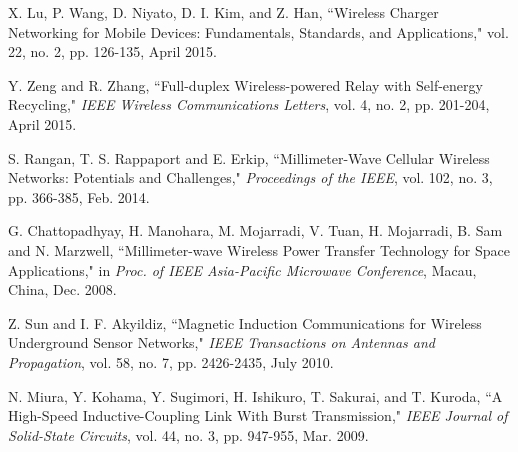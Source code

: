 \documentclass[twocolumn,10pt]{IEEEtran}
\begin{document}
\begin{thebibliography}{99}
X. Lu, P. Wang, D. Niyato, D. I. Kim, and Z. Han, ``Wireless Charger Networking for Mobile Devices: Fundamentals, Standards, and Applications," vol. 22, no. 2, pp. 126-135, April 2015.  
 
 
Y. Zeng and R. Zhang, ``Full-duplex Wireless-powered Relay with Self-energy Recycling,"   \emph{IEEE Wireless Communications Letters}, vol. 4, no. 2, pp. 201-204, April 2015.

 

S. Rangan, T. S. Rappaport and E. Erkip, ``Millimeter-Wave Cellular Wireless Networks: Potentials and Challenges," \emph{Proceedings of the IEEE}, vol. 102, no. 3, pp. 366-385, Feb. 2014.


G. Chattopadhyay, H. Manohara, M. Mojarradi, V. Tuan, H. Mojarradi, B. Sam and N. Marzwell, ``Millimeter-wave Wireless Power Transfer Technology for Space Applications," in \emph{Proc. of IEEE Asia-Pacific Microwave Conference}, Macau, China, Dec. 2008. 

Z. Sun and I. F. Akyildiz, ``Magnetic Induction Communications for Wireless Underground Sensor Networks," \emph{IEEE Transactions on 
Antennas and Propagation}, vol.	58, no. 7, pp. 2426-2435, July  2010.
 

N. Miura, Y. Kohama, Y. Sugimori, H. Ishikuro, T. Sakurai, and T. Kuroda, ``A High-Speed Inductive-Coupling Link With Burst Transmission," \emph{IEEE Journal of Solid-State Circuits}, 
vol. 44, no. 3, pp. 947-955, Mar. 2009.  
 
 
 
 























 










\end{thebibliography}




  


 
 
\end{document}
